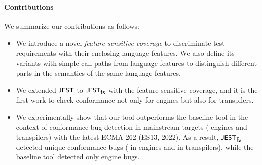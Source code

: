 
\paragraph{\textbf{Contributions}}
%
We summarize our contributions as follows:
%
\begin{itemize}

  \item
    We introduce a novel \textit{feature-sensitive coverage} to discriminate
    test requirements with their enclosing language features.
    We also define its variants with simple call paths from language features to
    distinguish different parts in the semantics of the same language features.

  \item
    We extended $\textsf{\small JEST}$ to $\textsf{\small JEST}_{\textsf{\small fs}}$ with the feature-sensitive coverage, and it
    is the first work to check conformance not only for engines but also for
    transpilers.

  \item
    We experimentally show that our tool outperforms the baseline tool in the
    context of conformance bug detection in  mainstream targets
    ( engines and  transpilers) with the latest ECMA-262
    (ES13, 2022).
    As a result, $\textsf{\small JEST}_{\textsf{\small fs}}$ detected  unique conformance bugs (
    in engines and  in transpilers), while the baseline tool detected
    only  engine bugs.
\end{itemize}
